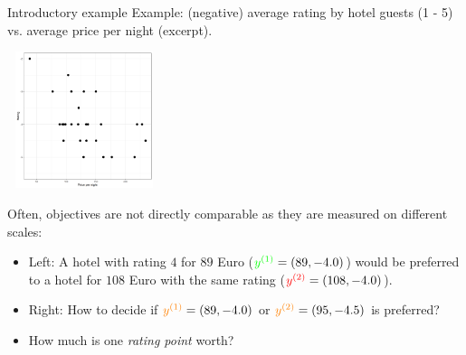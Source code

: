 \documentclass[11pt,compress,t,notes=noshow, xcolor=table]{beamer}
\begin{document}
\begin{vbframe}{Introductory example}
Example: (negative) average rating by hotel guests (1 - 5) vs. average price per night (excerpt).



\vspace*{0.2cm}

\begin{center}
\includegraphics[width = 4.5cm, height = 4cm ]{figure_man/price-per-night.png}
\end{center}
%

\framebreak
\footnotesize
Often, objectives are not directly comparable as they are measured on different scales:
\begin{itemize}
\item Left: A hotel with rating $4$ for $89$ Euro ($\textcolor{green}{y^{(1)}} = \left(89, - 4.0\right)$) would be preferred to a hotel for $108$ Euro with the same rating ($\textcolor{red}{y^{(2)}} = \left(108, - 4.0\right)$).
\item Right: How to decide if $\textcolor{orange}{y^{(1)}} = \left(89, - 4.0\right)$ or $\textcolor{orange}{y^{(2)}} = \left(95, - 4.5\right)$ is preferred?
\item How much is one \textit{rating point} worth?
\end{itemize}

\vspace{0.5cm}
\normalsize


\end{vbframe}
\end{document}
